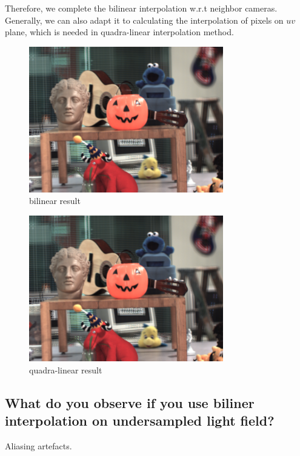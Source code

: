 \documentclass[acmtog]{acmart}
\begin{document}
	\quad Therefore, we complete the bilinear interpolation w.r.t neighbor cameras. Generally, we can also adapt it to calculating the interpolation of pixels on $uv$ plane, which is needed in quadra-linear interpolation method.

	\begin{figure}[htbp]
		\centering
		\includegraphics[scale=0.5]{bilinear.png}
		\caption{bilinear result}
		\label{fig:Fig4}
	\end{figure}

	\begin{figure}[htbp]
		\centering
		\includegraphics[scale=0.5]{quadra-linear.png}
		\caption{quadra-linear result}
		\label{fig:Fig5}
	\end{figure}

	\subsection*{What do you observe if you use biliner interpolation on undersampled light field?}
	\quad Aliasing artefacts. 
	
\end{document}
